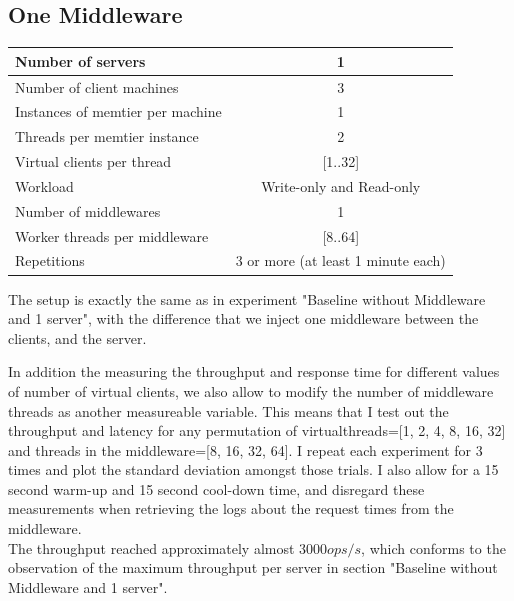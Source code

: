 \documentclass[11pt,a4paper]{article}
\begin{document}
\subsection{One Middleware}

\begin{center}
	\scriptsize{
		\begin{tabular}{|l|c|}
			\hline Number of servers                & 1                        \\ 
			\hline Number of client machines        & 3                        \\ 
			\hline Instances of memtier per machine & 1                        \\ 
			\hline Threads per memtier instance     & 2                        \\
			\hline Virtual clients per thread       & [1..32]                  \\ 
			\hline Workload                         & Write-only and Read-only \\
			\hline Number of middlewares            & 1                        \\
			\hline Worker threads per middleware    & [8..64]                  \\
			\hline Repetitions                      & 3 or more (at least 1 minute each)                \\ 
			\hline 
		\end{tabular}
	} 
\end{center}

The setup is exactly the same as in experiment "Baseline without Middleware and 1 server", with the difference that we inject one middleware between the 
clients, and the server.

In addition the measuring the throughput and response time for different values of number of virtual clients, we also allow to modify the number of middleware threads as another measureable variable.
This means that I test out the throughput and latency for any permutation of
virtualthreads=[1, 2, 4, 8, 16, 32] and threads in the middleware=[8, 16, 32, 64].
I repeat each experiment for 3 times and plot the standard deviation amongst those trials.
I also allow for a 15 second warm-up and 15 second cool-down time, and disregard these measurements when retrieving the logs about the request times from the middleware.\\

The throughput reached approximately almost $3000ops/s$, which conforms to the observation of the maximum throughput per server in section "Baseline without Middleware and 1 server". \\
\end{document}
